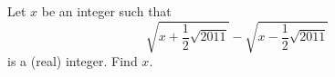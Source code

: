 Let $x$ be an integer such that
\[\sqrt{x+\dfrac12\sqrt{2011}}-\sqrt{x-\dfrac12\sqrt{2011}}\]
is a (real) integer. Find $x$.
